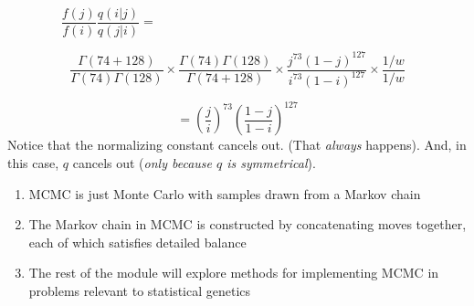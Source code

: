 \[
	\frac{f(j)}{f(i)}\frac{q(i|j)}{q(j|i)} = ~~~~~~~~~~~~~~~~~~~~~~~~~~~~~~~~~~~~~~~~~~~~~~~~~~~~~~~~~~~~~~~~~~~~~~~~~~~~~~~~~~~~~~~~~~~
\]

\[
 \frac{\Gamma(74+128)}
	{\Gamma(74)\Gamma(128)}\times
	\frac{\Gamma(74)\Gamma(128)}{\Gamma(74+128)}\times
	\frac{j^{73} (1-j)^{127}}{i^{73} (1-i)^{127}}\times
	\frac{1/w}{1/w}
\]

\[
= \left(\frac{j}{i}\right)^{73} 
\left(\frac{1-j}{1-i}\right)^{127}
\]
Notice that the normalizing constant cancels out.  (That {\em always} happens).  And, in this case, $q$ cancels out ({\em only because $q$ is symmetrical}).


\begin{enumerate}
\item MCMC is just Monte Carlo with samples drawn from a Markov chain
\item The Markov chain in MCMC is constructed by concatenating moves together, each of which satisfies detailed balance
\item The rest of the module will explore methods for implementing MCMC in problems relevant to statistical genetics
\end{enumerate}



